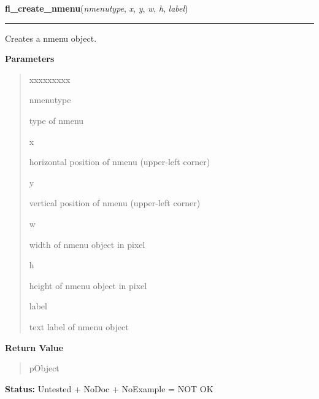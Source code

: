 \hspace{.8\funcindent}\begin{boxedminipage}{\funcwidth}

    \raggedright \textbf{fl\_create\_nmenu}(\textit{nmenutype}, \textit{x}, \textit{y}, \textit{w}, \textit{h}, \textit{label})

    \vspace{-1.5ex}

    \rule{\textwidth}{0.5\fboxrule}
\setlength{\parskip}{2ex}
    Creates a nmenu object.

\setlength{\parskip}{1ex}
      \textbf{Parameters}
      \vspace{-1ex}

      \begin{quote}
        \begin{Ventry}{xxxxxxxxx}

          \item[nmenutype]

          type of nmenu

          \item[x]

          horizontal position of nmenu (upper-left corner)

          \item[y]

          vertical position of nmenu (upper-left corner)

          \item[w]

          width of nmenu object in pixel

          \item[h]

          height of nmenu object in pixel

          \item[label]

          text label of nmenu object

        \end{Ventry}

      \end{quote}

      \textbf{Return Value}
    \vspace{-1ex}

      \begin{quote}
      pObject

      \end{quote}

\textbf{Status:} Untested + NoDoc + NoExample = NOT OK



    \end{boxedminipage}

